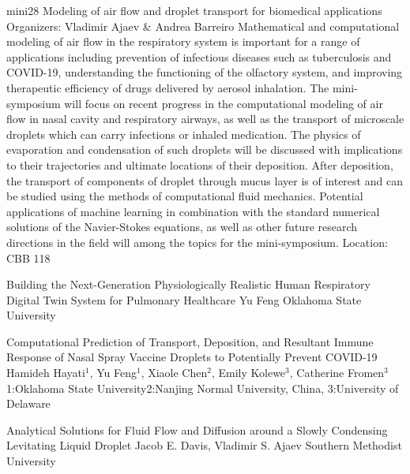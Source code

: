 \mini
{mini28}
{Modeling of air flow and droplet transport for biomedical applications}
{Organizers: Vladimir Ajaev \& Andrea Barreiro}
{Mathematical and computational modeling of air flow in the respiratory system is important for a range of applications including prevention of infectious diseases such as tuberculosis and COVID-19, understanding the functioning of the olfactory system, and improving therapeutic efficiency of drugs delivered by aerosol inhalation. The mini-symposium will focus on recent progress in the computational modeling of air flow in nasal cavity and respiratory airways, as well as the transport of microscale droplets which can carry infections or inhaled medication.    The physics of evaporation and condensation of such droplets will be discussed with implications to their trajectories and ultimate locations of their deposition. After deposition, the transport of components of droplet through mucus layer is of interest and can be studied using the methods of computational fluid mechanics. Potential applications of machine learning in combination with the standard numerical solutions of the Navier-Stokes equations, as well as other future research directions in the field will among the topics for the mini-symposium.}
{Location: CBB 118}

\begin{talks}
\item\talk
{Building the Next-Generation Physiologically Realistic Human Respiratory Digital Twin System for Pulmonary Healthcare}
{Yu Feng}
{Oklahoma State University}
\item\talk
{Computational Prediction of Transport, Deposition, and Resultant Immune Response of Nasal Spray Vaccine Droplets to Potentially Prevent COVID-19}
{Hamideh Hayati$^1$, Yu Feng$^1$, Xiaole Chen$^2$, Emily Kolewe$^3$, Catherine Fromen$^3$}
{1:Oklahoma State University2:Nanjing Normal University, China, 3:University of Delaware}
\item\talk
{Analytical Solutions for Fluid Flow and Diffusion around a Slowly Condensing Levitating Liquid Droplet}
{Jacob E. Davis, Vladimir S. Ajaev}
{Southern Methodist University}
\end{talks}
\room
